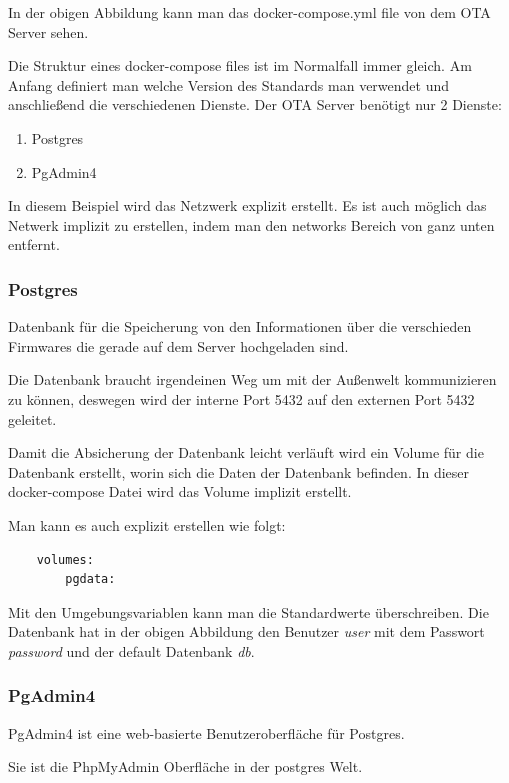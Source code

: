 In der obigen Abbildung kann man das docker-compose.yml file von dem OTA Server sehen.

Die Struktur eines docker-compose files ist im Normalfall immer gleich. Am Anfang definiert man welche Version des Standards man verwendet und anschließend die verschiedenen Dienste. Der OTA Server benötigt nur 2 Dienste:

\begin{enumerate}
    \item Postgres
    \item PgAdmin4
\end{enumerate}

In diesem Beispiel wird das Netzwerk explizit erstellt. Es ist auch möglich das Netwerk implizit zu erstellen, indem man den networks Bereich von ganz unten entfernt.

\subsubsection{Postgres}

Datenbank für die Speicherung von den Informationen über die verschieden Firmwares die gerade auf dem Server hochgeladen sind.

Die Datenbank braucht irgendeinen Weg um mit der Außenwelt kommunizieren zu können, deswegen wird der interne Port 5432 auf den externen Port 5432 geleitet.

Damit die Absicherung der Datenbank leicht verläuft wird ein Volume für die Datenbank erstellt, worin sich die Daten der Datenbank befinden. In dieser docker-compose Datei wird das Volume implizit erstellt. 

Man kann es auch explizit erstellen wie folgt:

\begin{verbatim}
    volumes:
        pgdata:
\end{verbatim}

Mit den Umgebungsvariablen kann man die Standardwerte überschreiben. Die Datenbank hat in der obigen Abbildung den Benutzer \textit{user} mit dem Passwort \textit{password} und der default Datenbank \textit{db}.

\subsubsection{PgAdmin4}

PgAdmin4 ist eine web-basierte Benutzeroberfläche für Postgres.

Sie ist die PhpMyAdmin Oberfläche in der postgres Welt.

